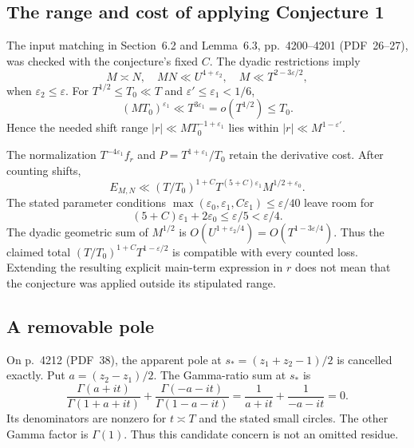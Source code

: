 \documentclass[10pt]{article}
\begin{document}
\subsection*{The range and cost of applying Conjecture 1}
The input matching in Section 6.2 and Lemma 6.3, pp. 4200–4201 (PDF 26–27), was checked with the conjecture’s fixed \(C\). The dyadic restrictions imply \[M\asymp N,\quad MN\ll U^{4+\varepsilon_2},\quad
M\ll T^{2-3\varepsilon/2},\] when \(\varepsilon_2\le\varepsilon\). For \(T^{1/2}\le T_0\ll T\) and \(\varepsilon'\le\varepsilon_1<1/6\), \[(MT_0)^{\varepsilon_1}\ll T^{3\varepsilon_1}
=o(T^{1/2})\le T_0.\] Hence the needed shift range \(|r|\ll MT_0^{-1+\varepsilon_1}\) lies within \(|r|\ll M^{1-\varepsilon'}\).\par
The normalization \(T^{-4\varepsilon_1}f_r\) and \(P=T^{1+\varepsilon_1}/T_0\) retain the derivative cost. After counting shifts, \[E_{M,N}\ll
(T/T_0)^{1+C}T^{(5+C)\varepsilon_1}M^{1/2+\varepsilon_0}.\] The stated parameter conditions \(\max(\varepsilon_0,\varepsilon_1,C\varepsilon_1)\le\varepsilon/40\) leave room for \[(5+C)\varepsilon_1+2\varepsilon_0\le\varepsilon/5<\varepsilon/4.\] The dyadic geometric sum of \(M^{1/2}\) is \(O(U^{1+\varepsilon_2/4})=O(T^{1-3\varepsilon/4})\). Thus the claimed total \((T/T_0)^{1+C}T^{1-\varepsilon/2}\) is compatible with every counted loss. Extending the resulting explicit main-term expression in \(r\) does not mean that the conjecture was applied outside its stipulated range.\par
\subsection*{A removable pole}
On p. 4212 (PDF 38), the apparent pole at \(s_*=(z_1+z_2-1)/2\) is cancelled exactly. Put \(a=(z_2-z_1)/2\). The Gamma-ratio sum at \(s_*\) is \[\frac{\Gamma(a+it)}{\Gamma(1+a+it)}
+\frac{\Gamma(-a-it)}{\Gamma(1-a-it)}
=\frac1{a+it}+\frac1{-a-it}=0.\] Its denominators are nonzero for \(t\asymp T\) and the stated small circles. The other Gamma factor is \(\Gamma(1)\). Thus this candidate concern is not an omitted residue.\par
\end{document}
